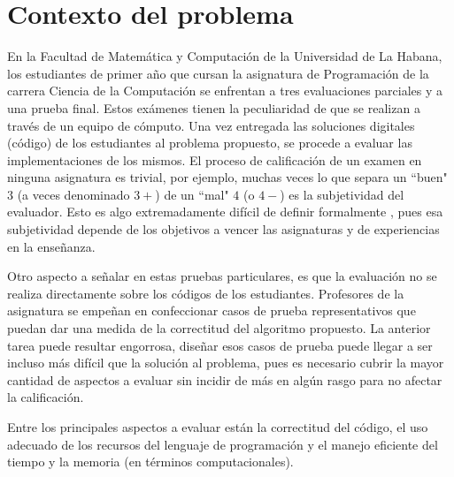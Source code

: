 \documentclass[a4paper,12pt]{book}
\begin{document}
	\section{Contexto del problema}
		
		En la Facultad de Matemática y Computación de la Universidad de La Habana, los estudiantes de primer año que cursan la asignatura de Programación de la carrera Ciencia de la Computación se enfrentan a tres evaluaciones parciales y a una prueba final. Estos exámenes tienen la peculiaridad de que se realizan a través de un equipo de cómputo. Una vez entregada las soluciones digitales (código) de los estudiantes al problema propuesto, se procede a evaluar las implementaciones de los mismos. El proceso de calificación de un examen en ninguna asignatura es trivial, por ejemplo, muchas veces lo que separa un ``buen" $3$ (a veces denominado $3+$) de un ``mal" $4$ (o $4-$) es la subjetividad del evaluador. Esto es algo extremadamente difícil de definir formalmente , pues esa subjetividad depende de los objetivos a vencer las asignaturas y de experiencias en la enseñanza. 
		
		Otro aspecto a señalar en estas pruebas particulares, es que la evaluación no se realiza directamente sobre los códigos de los estudiantes. Profesores de la asignatura se empeñan en confeccionar casos de prueba representativos que puedan dar una medida de la correctitud del algoritmo propuesto. La anterior tarea puede resultar engorrosa, diseñar esos casos de prueba puede llegar a ser incluso más difícil que la solución al problema, pues es necesario cubrir la mayor cantidad de aspectos a evaluar sin incidir de más en algún rasgo para no afectar la calificación.
		
		
		Entre los principales aspectos a evaluar están la correctitud del código, el uso adecuado de los recursos del lenguaje de programación y el manejo eficiente del tiempo y la memoria (en términos computacionales).
		
		
\end{document}
